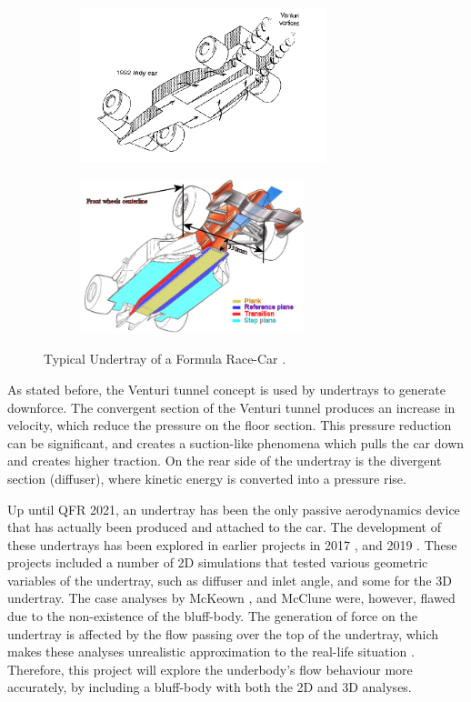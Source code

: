 \begin{figure}[!ht]
\begin{center}
%    
  \begin{subfigure}[b]{0.45\textwidth}
    \includegraphics[height=4.5cm]{Figures/underbody.PNG}
  \end{subfigure}
  \begin{subfigure}[b]{0.4\textwidth}
    \includegraphics[height=4.5cm]{Figures/undertray_f1.png}
  \end{subfigure}
%  
  \caption{Typical Undertray of a Formula Race-Car \cite{Katz1995RaceSpeed}\cite{AnonymousUndertrayUnderbody}.}
    \label{fig:underbody}
\end{center}
\end{figure}

\noindent As stated before, the Venturi tunnel concept is used by undertrays to generate downforce. The convergent section of the Venturi tunnel produces an increase in velocity, which reduce the pressure on the floor section. This pressure reduction can be significant, and creates a suction-like phenomena which pulls the car down and creates higher traction. On the rear side of the undertray is the divergent section (diffuser), where kinetic energy is converted into a pressure rise. 

\noindent Up until QFR 2021, an undertray has been the only passive aerodynamics device that has actually been produced and attached to the car. The development of these undertrays has been explored in earlier projects in 2017 \cite{McKeown2018DesignCar}, and 2019 \cite{McClune2018DesignCar}. These projects included a number of 2D simulations that tested various geometric variables of the undertray, such as diffuser and inlet angle, and some for the 3D undertray. The case analyses by McKeown \cite{McKeown2018DesignCar}, and McClune \cite{McClune2018DesignCar} were, however, flawed due to the non-existence of the bluff-body. The generation of force on the undertray is affected by the flow passing over the top of the undertray, which makes these analyses unrealistic approximation to the real-life situation \cite{Corr2017MechanicalAuthor}. Therefore, this project will explore the underbody's flow behaviour more accurately, by including a bluff-body with both the 2D and 3D analyses.   

